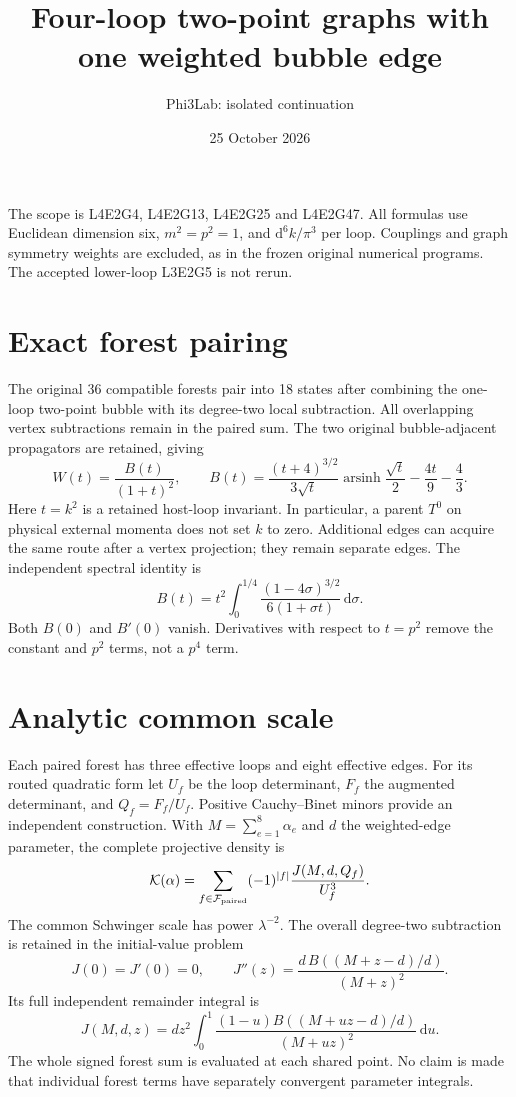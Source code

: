 \documentclass[11pt]{article}
\title{Four-loop two-point graphs with one weighted bubble edge}
\author{Phi3Lab: isolated continuation}
\date{25 October 2026}
\newcommand{\dd}{\mathrm{d}}
\begin{document}
\maketitle
The scope is L4E2G4, L4E2G13, L4E2G25 and L4E2G47.
All formulas use Euclidean dimension six, $m^2=p^2=1$, and
$\dd^6 k/\pi^3$ per loop. Couplings and graph symmetry weights are excluded,
as in the frozen original numerical programs. The accepted lower-loop
L3E2G5 is not rerun.

\section*{Exact forest pairing}
The original 36 compatible forests pair into 18 states after combining the
one-loop two-point bubble with its degree-two local subtraction. All
overlapping vertex subtractions remain in the paired sum. The two original
bubble-adjacent propagators are retained, giving
\[
 W(t)=\frac{B(t)}{(1+t)^2},\qquad
 B(t)=\frac{(t+4)^{3/2}}{3\sqrt t}
       \operatorname{arsinh}\frac{\sqrt t}{2}
       -\frac{4t}{9}-\frac43 .
\]
Here $t=k^2$ is a retained host-loop invariant. In particular, a parent
$T^0$ on physical external momenta does not set $k$ to zero.
Additional edges can acquire the same route after a vertex projection;
they remain separate edges. The independent spectral identity is
\[
 B(t)=t^2\int_0^{1/4}\frac{(1-4\sigma)^{3/2}}{6(1+\sigma t)}\,\dd\sigma .
\]
Both $B(0)$ and $B'(0)$ vanish. Derivatives with respect to $t=p^2$ remove
the constant and $p^2$ terms, not a $p^4$ term.

\section*{Analytic common scale}
Each paired forest has three effective loops and eight effective edges.
For its routed quadratic form let $U_f$ be the loop determinant,
$F_f$ the augmented determinant, and $Q_f=F_f/U_f$.
Positive Cauchy--Binet minors provide an independent construction.
With $M=\sum_{e=1}^8\alpha_e$ and $d$ the weighted-edge parameter, the
complete projective density is
\[
 \mathcal K(\alpha)=
 \sum_{f\in\mathcal F_{\rm paired}}(-1)^{|f|}
 \frac{J(M,d,Q_f)}{U_f^3}.
\]
The common Schwinger scale has power $\lambda^{-2}$. The overall
degree-two subtraction is retained in the initial-value problem
\[
 J(0)=J'(0)=0,\qquad
 J''(z)=\frac{d\,B((M+z-d)/d)}{(M+z)^2}.
\]
Its full independent remainder integral is
\[
 J(M,d,z)=d z^2\int_0^1
 \frac{(1-u)B((M+uz-d)/d)}{(M+uz)^2}\,\dd u .
\]
The whole signed forest sum is evaluated at each shared point.
No claim is made that individual forest terms have separately convergent
parameter integrals.
\end{document}
